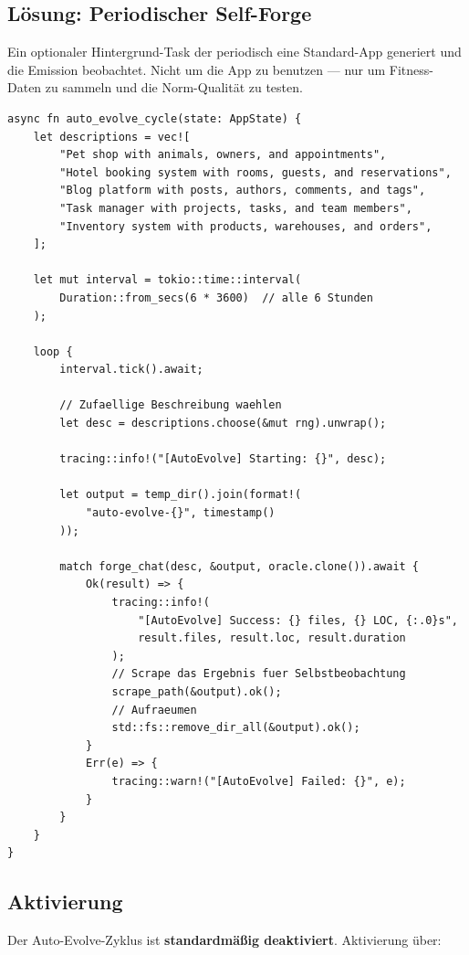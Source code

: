 \documentclass[11pt,a4paper]{article}
\begin{document}
\subsection{L\"osung: Periodischer Self-Forge}

Ein optionaler Hintergrund-Task der periodisch eine 
Standard-App generiert und die Emission beobachtet. 
Nicht um die App zu benutzen --- nur um Fitness-Daten 
zu sammeln und die Norm-Qualit\"at zu testen.

\begin{lstlisting}[style=rust]
async fn auto_evolve_cycle(state: AppState) {
    let descriptions = vec![
        "Pet shop with animals, owners, and appointments",
        "Hotel booking system with rooms, guests, and reservations",
        "Blog platform with posts, authors, comments, and tags",
        "Task manager with projects, tasks, and team members",
        "Inventory system with products, warehouses, and orders",
    ];
    
    let mut interval = tokio::time::interval(
        Duration::from_secs(6 * 3600)  // alle 6 Stunden
    );
    
    loop {
        interval.tick().await;
        
        // Zufaellige Beschreibung waehlen
        let desc = descriptions.choose(&mut rng).unwrap();
        
        tracing::info!("[AutoEvolve] Starting: {}", desc);
        
        let output = temp_dir().join(format!(
            "auto-evolve-{}", timestamp()
        ));
        
        match forge_chat(desc, &output, oracle.clone()).await {
            Ok(result) => {
                tracing::info!(
                    "[AutoEvolve] Success: {} files, {} LOC, {:.0}s",
                    result.files, result.loc, result.duration
                );
                // Scrape das Ergebnis fuer Selbstbeobachtung
                scrape_path(&output).ok();
                // Aufraeumen
                std::fs::remove_dir_all(&output).ok();
            }
            Err(e) => {
                tracing::warn!("[AutoEvolve] Failed: {}", e);
            }
        }
    }
}
\end{lstlisting}

\subsection{Aktivierung}

Der Auto-Evolve-Zyklus ist \textbf{standardm\"a{\ss}ig deaktiviert}. 
Aktivierung \"uber:
\end{document}
